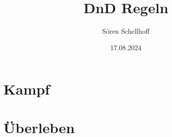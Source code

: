 \documentclass{book}
\title{DnD Regeln}
\author{Sören Schellhoff}
\date{17.08.2024}
\begin{document}
\maketitle

\chapter{Kampf}



\chapter{Überleben}

\end{document}
